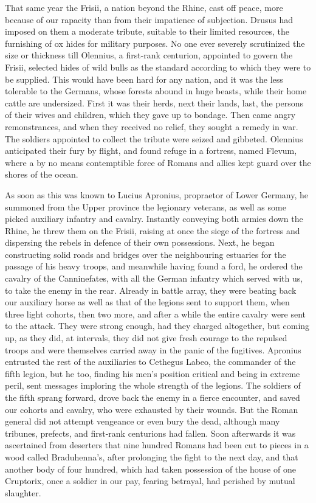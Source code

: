
That same year the Frisii, a nation beyond the Rhine, cast off peace, more because of our rapacity than from their impatience of subjection. Drusus had imposed on them a moderate tribute, suitable to their limited resources, the furnishing of ox hides for military purposes. No one ever severely scrutinized the size or thickness till Olennius, a first-rank centurion, appointed to govern the Frisii, selected hides of wild bulls as the standard according to which they were to be supplied. This would have been hard for any nation, and it was the less tolerable to the Germans, whose forests abound in huge beasts, while their home cattle are undersized. First it was their herds, next their lands, last, the persons of their wives and children, which they gave up to bondage. Then came angry remonstrances, and when they received no relief, they sought a remedy in war. The soldiers appointed to collect the tribute were seized and gibbeted. Olennius anticipated their fury by flight, and found refuge in a fortress, named Flevum, where a by no means contemptible force of Romans and allies kept guard over the shores of the ocean.


As soon as this was known to Lucius Apronius, propraetor of Lower Germany, he summoned from the Upper province the legionary veterans, as well as some picked auxiliary infantry and cavalry. Instantly conveying both armies down the Rhine, he threw them on the Frisii, raising at once the siege of the fortress and dispersing the rebels in defence of their own possessions. Next, he began constructing solid roads and bridges over the neighbouring estuaries for the passage of his heavy troops, and meanwhile having found a ford, he ordered the cavalry of the Canninefates, with all the German infantry which served with us, to take the enemy in the rear. Already in battle array, they were beating back our auxiliary horse as well as that of the legions sent to support them, when three light cohorts, then two more, and after a while the entire cavalry were sent to the attack. They were strong enough, had they charged altogether, but coming up, as they did, at intervals, they did not give fresh courage to the repulsed troops and were themselves carried away in the panic of the fugitives. Apronius entrusted the rest of the auxiliaries to Cethegus Labeo, the commander of the fifth legion, but he too, finding his men's position critical and being in extreme peril, sent messages imploring the whole strength of the legions. The soldiers of the fifth sprang forward, drove back the enemy in a fierce encounter, and saved our cohorts and cavalry, who were exhausted by their wounds. But the Roman general did not attempt vengeance or even bury the dead, although many tribunes, prefects, and first-rank centurions had fallen. Soon afterwards it was ascertained from deserters that nine hundred Romans had been cut to pieces in a wood called Braduhenna's, after prolonging the fight to the next day, and that another body of four hundred, which had taken possession of the house of one Cruptorix, once a soldier in our pay, fearing betrayal, had perished by mutual slaughter.

